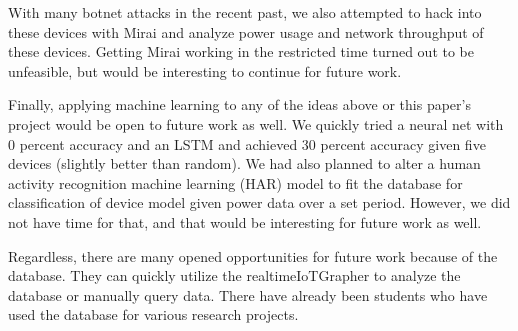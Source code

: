 With many botnet attacks in the recent past, we also attempted to hack into these devices with Mirai and analyze power usage and network throughput of these devices. Getting Mirai working in the restricted time turned out to be unfeasible, but would be interesting to continue for future work.

Finally, applying machine learning to any of the ideas above or this paper's project would be open to future work as well. We quickly tried a neural net with 0 percent accuracy and an LSTM and achieved 30 percent accuracy given five devices (slightly better than random). We had also planned to alter a human activity recognition machine learning (HAR)  model to fit the database for classification of device model given power data over a set period. However, we did not have time for that, and that would be interesting for future work as well.

Regardless, there are many opened opportunities for future work because of the database. They can quickly utilize the realtimeIoTGrapher to analyze the database or manually query data. There have already been students who have used the database for various research projects.